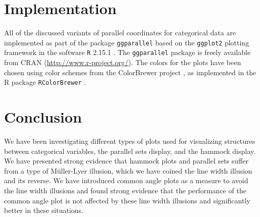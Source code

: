 %
%


%
%

\section{Implementation}\label{sec:implementation}

All  of the discussed variants of parallel coordinates for categorical data are implemented as part of the package {\tt ggparallel} based on the {\tt ggplot2} \cite{ggplot2} plotting framework in the software {\tt R} 2.15.1 \citep{R}. The  {\tt ggparallel} package is freely available from CRAN (\url{http://www.r-project.org/}).
The colors for the plots have been chosen using color schemes from the ColorBrewer project  \cite{colorbrewer} , as implemented in the R package {\tt RColorBrewer}  \cite{RColorBrewer} .


\section{Conclusion}
%
We have been investigating different types of plots used for visualizing structures between categorical variables, the parallel sets display, and the hammock display.
We have presented strong evidence that hammock plots and parallel sets suffer from a type of M\"uller-Lyer illusion, which we have coined the line width illusion and its reverse. 
We have introduced common angle plots as a measure to avoid the line width illusions and found strong evidence that  the performance of the common angle plot is not affected by these line width illusions and significantly better in these situations.

